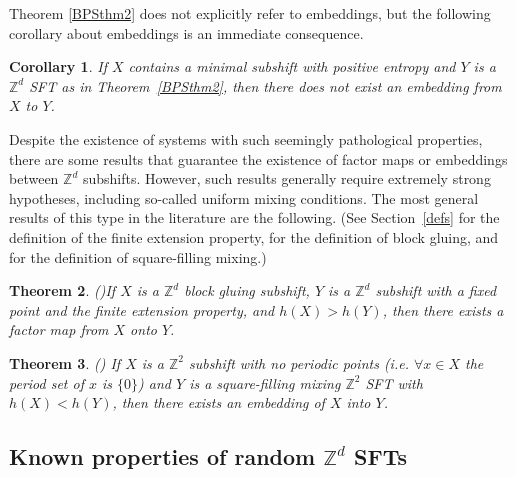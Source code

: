 \documentclass[12pt]{amsart}
\newtheorem{theorem}{Theorem}[section]
\newtheorem{corollary}[theorem]{Corollary}
\theoremstyle{definition}
\begin{document}
Theorem \ref{BPSthm2} does not explicitly refer to embeddings, but the following corollary about embeddings is an immediate consequence.

\begin{corollary}
If $X$ contains a minimal subshift with positive entropy and $Y$ is a $\mathbb{Z}^d$ SFT as in Theorem~\ref{BPSthm2}, then there does not exist an embedding from $X$ to $Y$.
\end{corollary}

Despite the existence of systems with such seemingly pathological properties, there are some results that guarantee the existence of factor maps or embeddings between $\mathbb{Z}^d$ subshifts. However, such results generally require extremely strong hypotheses, including so-called uniform mixing conditions.
The most general results of this type in the literature are the following. (See Section~\ref{defs} for the definition of the finite extension property, \cite{BPS} for the definition of block gluing, and \cite{Lightwood2003} for the definition of square-filling mixing.) 

\begin{theorem}{\rm (\cite{McGoffPavlov_factors})}\label{BMPthm}
If $X$ is a $\mathbb{Z}^d$ block gluing subshift, $Y$ is a $\mathbb{Z}^d$ subshift with a fixed point and the finite extension property, and $h(X) > h(Y)$, then there exists a factor map from $X$ onto $Y$.
\end{theorem}

\begin{theorem}{\rm (\cite{Lightwood2003})}
If $X$ is a $\mathbb{Z}^2$ subshift with no periodic points (i.e. $\forall x \in X$ the period set of $x$ is $\{0\}$) and $Y$ is a square-filling mixing $\mathbb{Z}^2$ SFT with $h(X) < h(Y)$, then there exists an embedding of $X$ into $Y$.
\end{theorem}


\subsection{Known properties of random $\mathbb{Z}^d$ SFTs}\label{randomsubsec}
\end{document}
